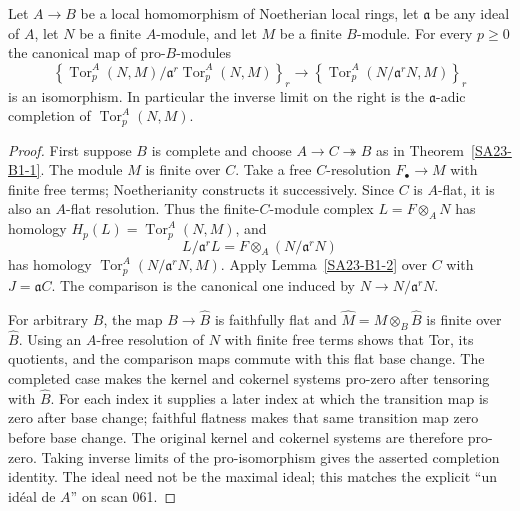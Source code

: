 \begin{theorem}\label{SA23-B1-3}
Let $A\to B$ be a local homomorphism of Noetherian local rings,
let $\mathfrak a$ be any ideal of $A$, let $N$ be a finite $A$-module,
and let $M$ be a finite $B$-module.  For every $p\ge0$ the canonical
map of pro-$B$-modules
\[
 \left\{\operatorname{Tor}^A_p(N,M)\big/
      \mathfrak a^r\operatorname{Tor}^A_p(N,M)\right\}_r
 \longrightarrow
 \left\{\operatorname{Tor}^A_p(N/\mathfrak a^rN,M)\right\}_r
\]
is an isomorphism.  In particular the inverse limit on the right is
the $\mathfrak a$-adic completion of $\operatorname{Tor}^A_p(N,M)$.
\end{theorem}
\begin{proof}
First suppose $B$ is complete and choose $A\to C\twoheadrightarrow B$
as in Theorem~\ref{SA23-B1-1}.  The module $M$ is finite over $C$.
Take a free $C$-resolution $F_\bullet\to M$ with finite free terms;
Noetherianity constructs it successively.  Since $C$ is $A$-flat,
it is also an $A$-flat resolution.  Thus the finite-$C$-module complex
$L=F\otimes_A N$ has homology
$H_p(L)=\operatorname{Tor}^A_p(N,M)$, and
\[
 L/\mathfrak a^rL=F\otimes_A(N/\mathfrak a^rN)
\]
has homology $\operatorname{Tor}^A_p(N/\mathfrak a^rN,M)$.
Apply Lemma~\ref{SA23-B1-2} over $C$ with $J=\mathfrak aC$.
The comparison is the canonical one induced by $N\to N/\mathfrak a^rN$.

For arbitrary $B$, the map $B\to\widehat B$ is faithfully flat and
$\widehat M=M\otimes_B\widehat B$ is finite over $\widehat B$.
Using an $A$-free resolution of $N$ with finite free terms shows that
Tor, its quotients, and the comparison maps commute with this flat
base change.  The completed case makes the kernel and cokernel
systems pro-zero after tensoring with $\widehat B$.  For each index
it supplies a later index at which the transition map is zero after
base change; faithful flatness makes that same transition map zero
before base change.  The original kernel and cokernel systems are
therefore pro-zero.  Taking inverse limits of the pro-isomorphism
gives the asserted completion identity.  The ideal need not be the
maximal ideal; this matches the explicit ``un id\'eal de $A$'' on
scan 061.
\end{proof}
